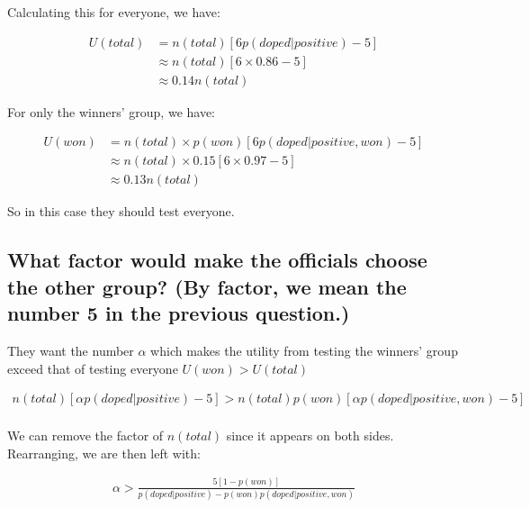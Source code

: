 \documentclass[11pt,fullpage]{book}
\begin{document}
Calculating this for everyone, we have:

\begin{equation}
\begin{align}
U(total) &= n(total)\left[6 p(doped|positive) - 5\right]\\
&\approx n(total)\left[6\times 0.86 - 5\right]\\
&\approx 0.14 n(total)
\end{align}
\end{equation}

For only the winners' group, we have:

\begin{equation}
\begin{align}
U(won) &= n(total)\times p(won)\left[6 p(doped|positive,won) - 5\right]\\
&\approx n(total) \times 0.15 \left[6 \times 0.97 - 5\right]\\
&\approx 0.13 n(total)
\end{align}
\end{equation}

So in this case they should test everyone.

\subsection{What factor would make the officials choose the other group? (By factor, we mean the number 5 in the previous question.)}
They want the number $\alpha$ which makes the utility from testing the winners' group exceed that of testing everyone $U(won) > U(total)$ \implies

\begin{equation}
\begin{align}
n(total)\left[\alpha p(doped|positive) - 5\right] > n(total)p(won)\left[\alpha p(doped|positive,won) - 5\right]\\
\end{align}
\end{equation}

We can remove the factor of $n(total)$ since it appears on both sides. Rearranging, we are then left with:

\begin{equation}
\begin{align}
\alpha > \frac{5\left[1-p(won)\right]}{p(doped|positive) - p(won) p(doped|positive,won)}
\end{align}
\end{equation}
\end{document}
